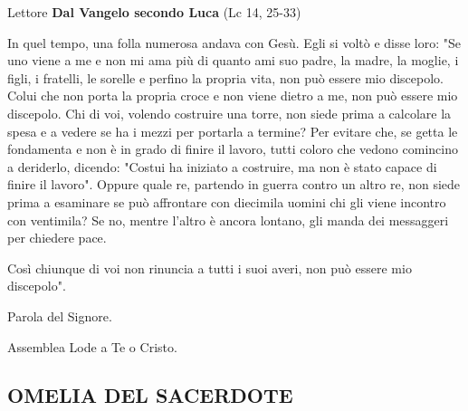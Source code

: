 \begin{dialoghi}
\item[Lettore] \textbf{Dal Vangelo secondo Luca} (Lc 14, 25-33)

In quel tempo, una folla numerosa andava con Gesù. Egli si voltò e disse loro: "Se uno viene a me e non mi ama più di quanto ami suo padre, la madre, la moglie, i figli, i fratelli, le sorelle e perfino la propria vita, non può essere mio discepolo. Colui che non porta la propria croce e non viene dietro a me, non può essere mio discepolo. Chi di voi, volendo costruire una torre, non siede prima a calcolare la spesa e a vedere se ha i mezzi per portarla a termine? Per evitare che, se getta le fondamenta e non è in grado di finire il lavoro, tutti coloro che vedono comincino a deriderlo, dicendo: "Costui ha iniziato a costruire, ma non è stato capace di finire il lavoro". Oppure quale re, partendo in guerra contro un altro re, non siede prima a esaminare se può affrontare con diecimila uomini chi gli viene incontro con ventimila? Se no, mentre l'altro è ancora lontano, gli manda dei messaggeri per chiedere pace.

Così chiunque di voi non rinuncia a tutti i suoi averi, non può essere mio discepolo".

Parola del Signore.
\item[Assemblea] Lode a Te o Cristo.
\end{dialoghi}

\subsection*{OMELIA DEL SACERDOTE}
